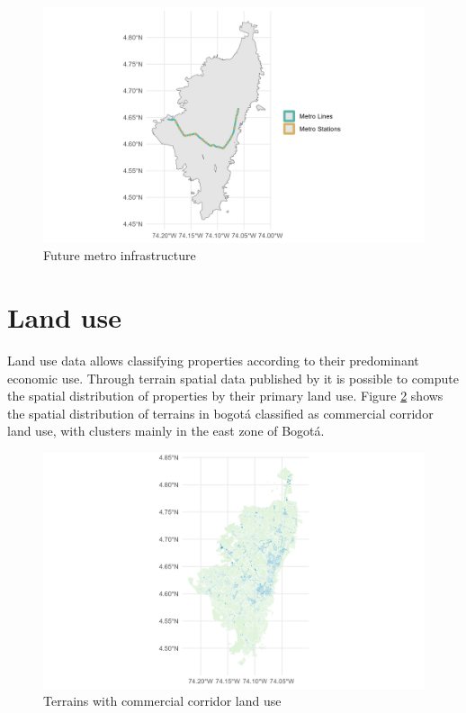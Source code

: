 \documentclass[12pt, a4paper]{report}
\begin{document}
\begin{figure}[H]
    \centering
    \includegraphics[width=15cm]{Data/Results/Images/Metro_Network.png}
    \caption{Future metro infrastructure \citep{alcaldiadebogotad.c.EstacionesPrimeraLinea2022, alcaldiadebogotad.c.TrazadoPrimeraLinea2022}}
    \label{fig:Metro_Network}
\end{figure}

\section{Land use}

Land use data allows classifying properties according to their predominant economic use. Through terrain spatial data published by \cite{alcaldiadebogotad.c.DestinoEconomicoPredominante2022} it is possible to compute the spatial distribution of properties by their primary land use. Figure \ref{fig:Land_Use_Commercial} shows the spatial distribution of terrains in bogotá classified as commercial corridor land use, with clusters mainly in the east zone of Bogotá. 

\begin{figure}[H]
    \centering
    \includegraphics[width=15cm]{Data/Results/Images/Land_Use_Commercial_Corridor_Terrain.png}
    \caption{Terrains with commercial corridor land use \citep{alcaldiadebogotad.c.DestinoEconomicoPredominante2022}}
    \label{fig:Land_Use_Commercial}
\end{figure}
\end{document}
